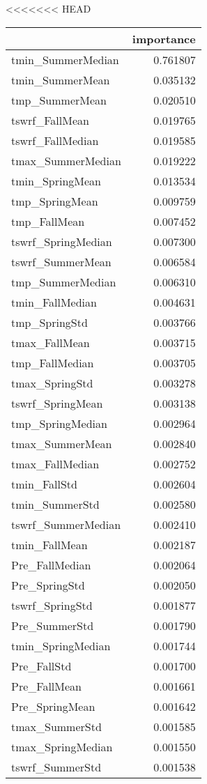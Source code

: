 <<<<<<< HEAD
\begin{tabular}{lr}
\toprule
 & importance \\
\midrule
tmin_SummerMedian & 0.761807 \\
tmin_SummerMean & 0.035132 \\
tmp_SummerMean & 0.020510 \\
tswrf_FallMean & 0.019765 \\
tswrf_FallMedian & 0.019585 \\
tmax_SummerMedian & 0.019222 \\
tmin_SpringMean & 0.013534 \\
tmp_SpringMean & 0.009759 \\
tmp_FallMean & 0.007452 \\
tswrf_SpringMedian & 0.007300 \\
tswrf_SummerMean & 0.006584 \\
tmp_SummerMedian & 0.006310 \\
tmin_FallMedian & 0.004631 \\
tmp_SpringStd & 0.003766 \\
tmax_FallMean & 0.003715 \\
tmp_FallMedian & 0.003705 \\
tmax_SpringStd & 0.003278 \\
tswrf_SpringMean & 0.003138 \\
tmp_SpringMedian & 0.002964 \\
tmax_SummerMean & 0.002840 \\
tmax_FallMedian & 0.002752 \\
tmin_FallStd & 0.002604 \\
tmin_SummerStd & 0.002580 \\
tswrf_SummerMedian & 0.002410 \\
tmin_FallMean & 0.002187 \\
Pre_FallMedian & 0.002064 \\
Pre_SpringStd & 0.002050 \\
tswrf_SpringStd & 0.001877 \\
Pre_SummerStd & 0.001790 \\
tmin_SpringMedian & 0.001744 \\
Pre_FallStd & 0.001700 \\
Pre_FallMean & 0.001661 \\
Pre_SpringMean & 0.001642 \\
tmax_SummerStd & 0.001585 \\
tmax_SpringMedian & 0.001550 \\
tswrf_SummerStd & 0.001538 \\

\end{tabular}
